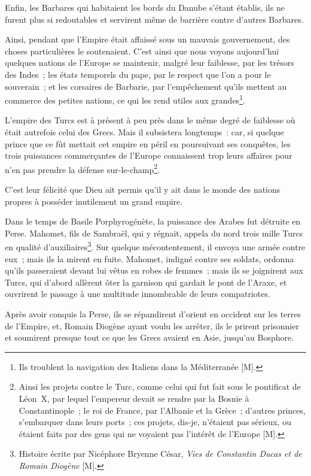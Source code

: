 \documentclass[french,twoside]{book} %
\begin{document}
Enfin, les Barbares qui habitaient les bords du Danube s’étant établis, ils ne furent plus si redoutables et servirent même de barrière contre d’autres Barbares.\par
Ainsi, pendant que l’Empire était affaissé sous un mauvais gouvernement, des choses particulières le soutenaient. C’est ainsi que nous voyons aujourd’hui quelques nations de l’Europe se maintenir, malgré leur faiblesse, par les trésors des Indes ; les états temporels du pape, par le respect que l’on a pour le souverain ; et les corsaires de Barbarie, par l’empêchement qu’ils mettent au commerce des petites nations, ce qui les rend utiles aux grandes\footnote{Ils troublent la navigation des Italiens dans la Méditerranée [M].}.\par
L’empire des Turcs est à présent à peu près dans le même degré de faiblesse où était autrefois celui des Grecs. Mais il subsistera longtemps : car, si quelque prince que ce fût mettait cet empire en péril en poursuivant ses conquêtes, les trois puissances commerçantes de l’Europe connaissent trop leurs affaires pour n’en pas prendre la défense sur-le-champ\footnote{Ainsi les projets contre le Turc, comme celui qui fut fait sous le pontificat de Léon X, par lequel l’empereur devait se rendre par la Bosnie à Constantinople ; le roi de France, par l’Albanie et la Grèce ; d’autres princes, s’embarquer dans leurs ports ; ces projets, dis-je, n’étaient pas sérieux, ou étaient faits par des gens qui ne voyaient pas l’intérêt de l’Europe [M].}.\par
C’est leur félicité que Dieu ait permis qu’il y ait dans le monde des nations propres à posséder inutilement un grand empire.\par
Dans le temps de Basile Porphyrogénète, la puissance des Arabes fut détruite en Perse. Mahomet, fils de Sambraël, qui y régnait, appela du nord trois mille Turcs en qualité d’auxiliaires\footnote{Histoire écrite par Nicéphore Bryenne César, {\itshape Vies de Constantin Ducas et de Romain Diogène} [M].}. Sur quelque mécontentement, il envoya une armée contre eux ; mais ils la mirent en fuite. Mahomet, indigné contre ses soldats, ordonna qu’ils passeraient devant lui vêtus en robes de femmes ; mais ils se joignirent aux Turcs, qui d’abord allèrent ôter la garnison qui gardait le pont de l’Araxe, et ouvrirent le passage à une multitude innombrable de leurs compatriotes.\par
Après avoir conquis la Perse, ils se répandirent d’orient en occident sur les terres de l’Empire, et, Romain Diogène ayant voulu les arrêter, ils le prirent prisonnier et soumirent presque tout ce que les Grecs avaient en Asie, jusqu’au Bosphore.\par
\end{document}
